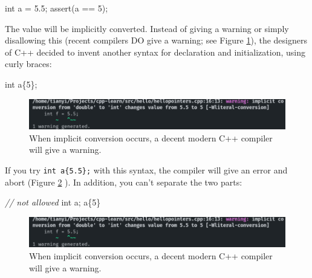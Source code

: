 \documentclass[
]{book}
\newenvironment{Shaded}{\begin{snugshade}}{\end{snugshade}}
\newcommand{\CommentTok}[1]{\textcolor[rgb]{0.56,0.35,0.01}{\textit{#1}}}
\newcommand{\DataTypeTok}[1]{\textcolor[rgb]{0.13,0.29,0.53}{#1}}
\newcommand{\DecValTok}[1]{\textcolor[rgb]{0.00,0.00,0.81}{#1}}
\newcommand{\FloatTok}[1]{\textcolor[rgb]{0.00,0.00,0.81}{#1}}
\newcommand{\NormalTok}[1]{#1}
\newcommand{\OtherTok}[1]{\textcolor[rgb]{0.56,0.35,0.01}{#1}}
\begin{document}
\begin{Shaded}
\begin{Highlighting}[]
\DataTypeTok{int}\NormalTok{ a = }\FloatTok{5.5}\NormalTok{;}
\OtherTok{assert}\NormalTok{(a == }\DecValTok{5}\NormalTok{);}
\end{Highlighting}
\end{Shaded}

The value will be implicitly converted. Instead of giving a warning or simply disallowing this (recent compilers DO give a warning; see Figure \ref{fig:equal}), the designers of C++ decided to invent another syntax for declaration and initialization, using curly braces:

\begin{Shaded}
\begin{Highlighting}[]
\DataTypeTok{int}\NormalTok{ a\{}\DecValTok{5}\NormalTok{\};}
\end{Highlighting}
\end{Shaded}

\begin{figure}
\centering
\includegraphics{img/equal.png}
\caption{\label{fig:equal}When implicit conversion occurs, a decent modern C++ compiler will give a warning.}
\end{figure}

If you try \texttt{int\ a\{5.5\};} with this syntax, the compiler will give an error and abort (Figure \ref{fig:braces} ). In addition, you can't separate the two parts:

\begin{Shaded}
\begin{Highlighting}[]
\CommentTok{// not allowed}
\DataTypeTok{int}\NormalTok{ a;}
\NormalTok{a\{}\DecValTok{5}\NormalTok{\}}
\end{Highlighting}
\end{Shaded}

\begin{figure}
\centering
\includegraphics{img/equal.png}
\caption{\label{fig:braces}When implicit conversion occurs, a decent modern C++ compiler will give a warning.}
\end{figure}
\end{document}
